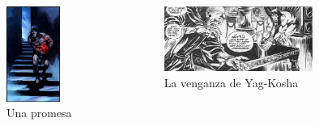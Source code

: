 \begin{frame}{}
\begin{columns}
    \begin{figure}[htb]
    \centering
        \includegraphics[width=0.7\textwidth]{img/res/19}
        \caption{Una promesa}
    \end{figure}    
    \begin{figure}[htb]
    \centering
        \includegraphics[width=0.8\textwidth]{img/res/20}
        \caption{La venganza de Yag-Kosha}
    \end{figure}    
\end{columns}
\end{frame}

